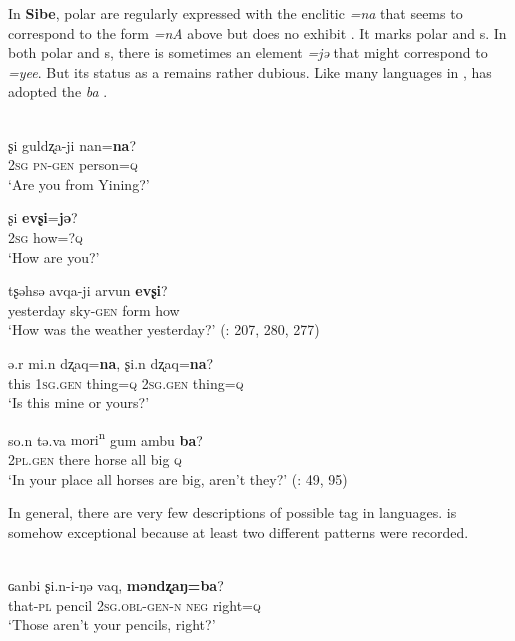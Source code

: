 In \textbf{Sibe}, polar  are regularly expressed with the enclitic \textit{=na} that seems to correspond to the  form \textit{=nA} above but does no exhibit . It marks polar and s. In both polar and s, there is sometimes an element \textit{=jə} that might correspond to  \textit{=yee}. But its status as a  remains rather dubious. Like many languages in ,  has adopted the   \textit{ba} .

\ea%
    \label{ex:tungu:67}
    \\
    \ea
    \gll ʂi  guldʐa-ji  nan=\textbf{{na}}?\\
    2\textsc{sg}  \textsc{pn}-\textsc{gen}    person=\textsc{q}\\
    \glt ‘Are you from Yining?’
    
    \ex
    \gll ʂi \textbf{{evʂi}}{=}\textbf{{jə}}?\\
    2\textsc{sg}  how=?\textsc{q}\\
    \glt ‘How are you?’
    
    \ex
    \gll tʂəhsə avqa-ji    arvun \textbf{{evʂi}}?\\
    yesterday  sky-\textsc{gen}  form  how\\
    \glt ‘How was the weather yesterday?’ (\citealt{Chaoke2006}: 207, 280, 277)
    
    \ex
    \gll ə.r  mi.{n} dʐaq=\textbf{{na}},  ʂi.{n} dʐaq=\textbf{{na}}?\\
    this  1\textsc{sg.gen}  thing=\textsc{q}  2\textsc{sg}.\textsc{gen}  thing=\textsc{q}\\
    \glt ‘Is this mine or yours?’
    
    \ex
    \gll so.{n} tə.{va} {mori\textsuperscript{n}} gum ambu \textbf{{ba}}?\\
    2\textsc{pl}.\textsc{gen}  there  horse  all  big  \textsc{q}\\
    \glt ‘In your place all horses are big, aren’t they?’ (\citealt{Zikmundová2013}: 49, 95)
    \z
    \z 

In general, there are very few descriptions of possible tag  in  languages.  is somehow exceptional because at least two different  patterns were recorded.

\ea%
    \label{ex:tungu:68}
    \\
    \ea
     ɢanbi ʂi.{n-}{i-}{ŋə} vaq, \textbf{{məndʐaŋ}}\textbf{{=}}\textbf{{ba}}?\\
    that-\textsc{pl}  pencil    2\textsc{sg}.\textsc{obl}-\textsc{gen}-\textsc{n}  \textsc{neg} right=\textsc{q}\\
    \glt ‘Those aren’t your pencils, right?’
    
